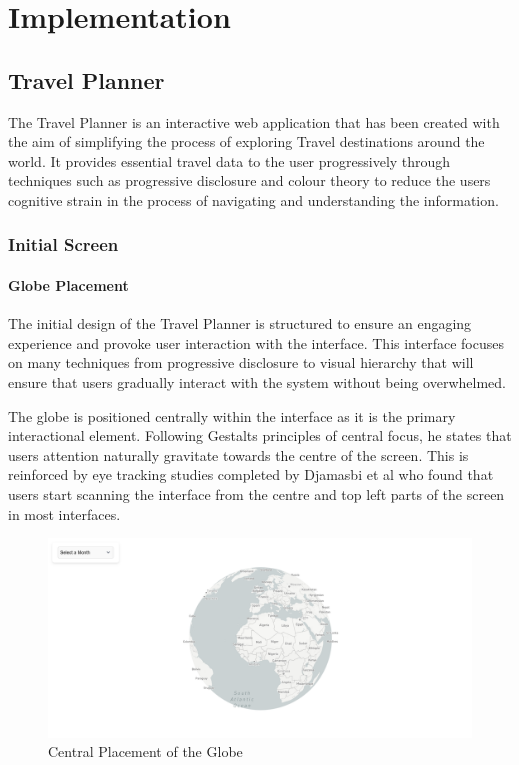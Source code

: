 \documentclass[]{project_final}
\begin{document}
\chapter{Implementation}
\section{Travel Planner}
The Travel Planner is an interactive web application that has been created with the aim
of simplifying the process of exploring Travel destinations around the world. It provides
essential travel data to the user progressively through techniques such as progressive disclosure and colour theory to reduce the users cognitive strain in the process of navigating and understanding the information.

\subsection{Initial Screen}
\subsubsection{Globe Placement}
The initial design of the Travel Planner is structured to ensure an engaging experience and provoke user interaction with the interface. This interface focuses on many techniques from progressive disclosure to visual hierarchy that will ensure that users gradually interact with the system without being overwhelmed.

The globe is positioned centrally within the interface as it is the primary interactional element. Following Gestalts principles of central focus, he states that users attention naturally gravitate towards the centre of the screen. This is reinforced by eye tracking studies completed by Djamasbi et al who found that users start scanning the interface from the centre and top left parts of the screen in most interfaces.

\begin{figure}[ht!]
    \centering
    \includegraphics[width=\textwidth]{1.png}
    \caption{Central Placement of the Globe}
    \label{fig:1}
\end{figure}
\end{document}

